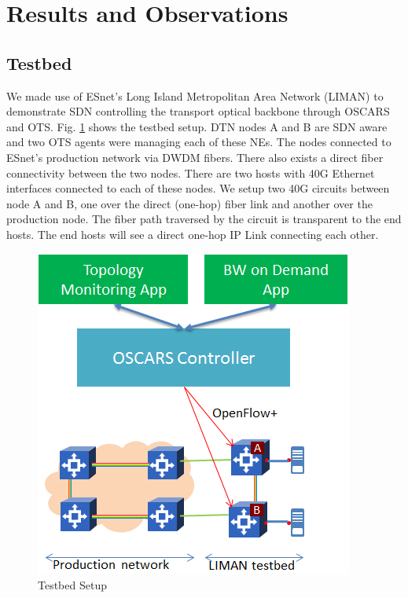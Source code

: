 \documentclass{sig-alternate-10pt}
\begin{document}
\section{Results and Observations}
\label{sec:results}
	\subsection{Testbed}
	\label{sec:testbed}
	We made use of ESnet's Long Island Metropolitan Area Network (LIMAN) to demonstrate SDN controlling the
	 transport optical backbone through OSCARS and OTS. Fig. \ref{fig:LIMAN} shows the testbed setup. DTN
	nodes A and B are SDN aware and two OTS agents were managing each of these NEs. The nodes connected
	to ESnet's production network via DWDM fibers. There also exists a direct fiber connectivity between the two
	nodes. There are two hosts with 40G Ethernet interfaces connected to each of these nodes. We setup two 40G 
	circuits between node A and B, one over the direct (one-hop) fiber link and another over the production node.
	The fiber path traversed by the circuit is transparent to the end hosts. The end hosts will see a direct one-hop
	IP Link connecting each other.

	\begin{figure}[htb]
	\centering
	\includegraphics[scale=0.50]{LIMAN.png}
	\caption{Testbed Setup}
	\label{fig:LIMAN}
	\end{figure}
\end{document}
